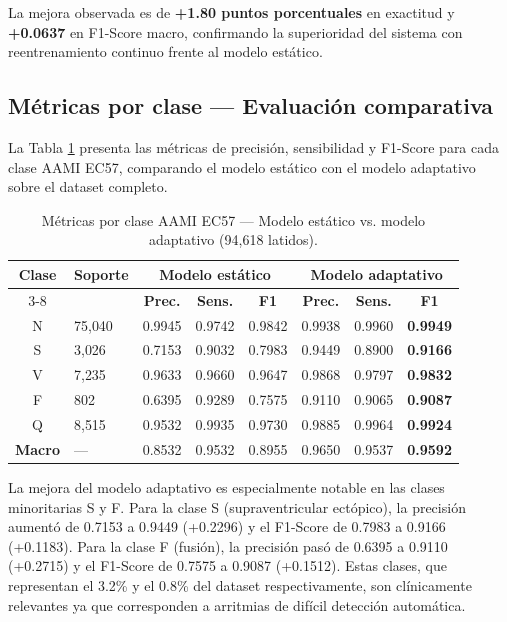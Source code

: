 La mejora observada es de \textbf{+1.80 puntos porcentuales} en exactitud y \textbf{+0.0637} en F1-Score macro, confirmando la superioridad del sistema con reentrenamiento continuo frente al modelo estático.

\subsection{Métricas por clase — Evaluación comparativa}

La Tabla \ref{T_por_clase} presenta las métricas de precisión, sensibilidad y F1-Score para cada clase AAMI EC57, comparando el modelo estático con el modelo adaptativo sobre el dataset completo.

\begin{table}[h]
\caption{Métricas por clase AAMI EC57 — Modelo estático vs. modelo adaptativo (94{,}618 latidos).}
\label{T_por_clase}
\begin{center}
\renewcommand{\arraystretch}{1.15}
\begin{tabular}{clcccccc}
\hline
\multirow{2}{*}{\textbf{Clase}} & \multirow{2}{*}{\textbf{Soporte}} &
\multicolumn{3}{c}{\textbf{Modelo estático}} &
\multicolumn{3}{c}{\textbf{Modelo adaptativo}} \\
\cline{3-8}
& & \textbf{Prec.} & \textbf{Sens.} & \textbf{F1} &
  \textbf{Prec.} & \textbf{Sens.} & \textbf{F1} \\
\hline
N & 75{,}040 & 0.9945 & 0.9742 & 0.9842 & 0.9938 & 0.9960 & \textbf{0.9949} \\
S &  3{,}026 & 0.7153 & 0.9032 & 0.7983 & 0.9449 & 0.8900 & \textbf{0.9166} \\
V &  7{,}235 & 0.9633 & 0.9660 & 0.9647 & 0.9868 & 0.9797 & \textbf{0.9832} \\
F &    802   & 0.6395 & 0.9289 & 0.7575 & 0.9110 & 0.9065 & \textbf{0.9087} \\
Q &  8{,}515 & 0.9532 & 0.9935 & 0.9730 & 0.9885 & 0.9964 & \textbf{0.9924} \\
\hline
\textbf{Macro} & — & 0.8532 & 0.9532 & 0.8955 & 0.9650 & 0.9537 & \textbf{0.9592} \\
\hline
\end{tabular}
\end{center}
\end{table}

La mejora del modelo adaptativo es especialmente notable en las clases minoritarias S y F. Para la clase S (supraventricular ectópico), la precisión aumentó de 0.7153 a 0.9449 (+0.2296) y el F1-Score de 0.7983 a 0.9166 (+0.1183). Para la clase F (fusión), la precisión pasó de 0.6395 a 0.9110 (+0.2715) y el F1-Score de 0.7575 a 0.9087 (+0.1512). Estas clases, que representan el 3.2\% y el 0.8\% del dataset respectivamente, son clínicamente relevantes ya que corresponden a arritmias de difícil detección automática.


